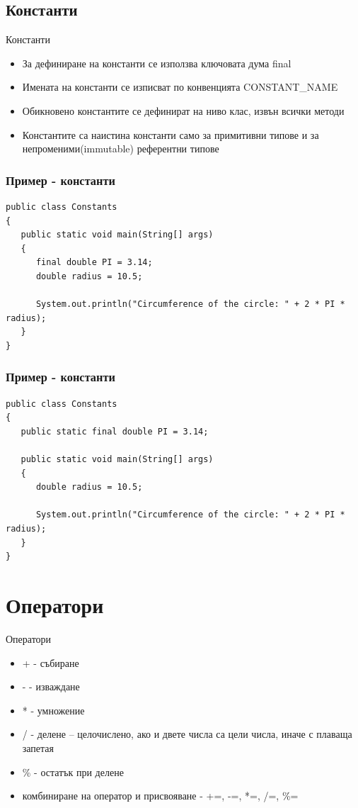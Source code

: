 \documentclass{beamer}
\begin{document}
\subsection{Константи}
\begin{frame}{Константи}
  \transdissolve
  \begin{itemize}
  \item За дефиниране на константи се използва ключовата дума final \pause
  \item Имената на константи се изписват по конвенцията CONSTANT\_NAME \pause
  \item Обикновено константите се дефинират на ниво клас, извън всички
    методи \pause
  \item Константите са наистина константи само за примитивни типове и
    за непроменими(immutable) референтни типове \pause
  \end{itemize}
\end{frame}

\begin{frame}[fragile]
  \frametitle{Пример - константи}
  \transdissolve
\begin{lstlisting}
public class Constants
{
   public static void main(String[] args)
   {
      final double PI = 3.14;
      double radius = 10.5;

      System.out.println("Circumference of the circle: " + 2 * PI * radius);
   }
}
\end{lstlisting}
\end{frame}

\begin{frame}[fragile]
  \frametitle{Пример - константи}
  \transdissolve
\begin{lstlisting}
public class Constants
{
   public static final double PI = 3.14;

   public static void main(String[] args)
   {
      double radius = 10.5;

      System.out.println("Circumference of the circle: " + 2 * PI * radius);
   }
}
\end{lstlisting}
\end{frame}

\section{Оператори}
\begin{frame}{Оператори}
  \transdissolve
  \begin{itemize}
  \item + - събиране \pause
  \item - - изваждане \pause
  \item * - умножение \pause
  \item / - делене – целочислено, ако и двете
    числа са цели числа, иначе с плаваща
    запетая \pause
  \item \% - остатък при делене \pause
  \item комбиниране на оператор и присвояване - +=, -=, *=, /=, \%=
  \end{itemize}
\end{frame}
\end{document}
